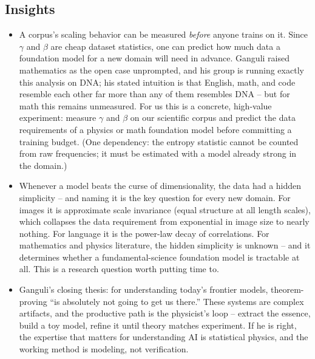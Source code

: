 \documentclass[11pt]{article}
\begin{document}
\subsection*{Insights}
\begin{itemize}
    \item A corpus's scaling behavior can be measured \emph{before} anyone trains on it. Since $\gamma$ and $\beta$ are cheap dataset statistics, one can predict how much data a foundation model for a new domain will need in advance. Ganguli raised mathematics as the open case unprompted, and his group is running exactly this analysis on DNA; his stated intuition is that English, math, and code resemble each other far more than any of them resembles DNA -- but for math this remains unmeasured. For us this is a concrete, high-value experiment: measure $\gamma$ and $\beta$ on our scientific corpus and predict the data requirements of a physics or math foundation model before committing a training budget. (One dependency: the entropy statistic cannot be counted from raw frequencies; it must be estimated with a model already strong in the domain.)
    \item Whenever a model beats the curse of dimensionality, the data had a hidden simplicity -- and naming it is the key question for every new domain. For images it is approximate scale invariance (equal structure at all length scales), which collapses the data requirement from exponential in image size to nearly nothing. For language it is the power-law decay of correlations. For mathematics and physics literature, the hidden simplicity is unknown -- and it determines whether a fundamental-science foundation model is tractable at all. This is a research question worth putting time to.
    \item Ganguli's closing thesis: for understanding today's frontier models, theorem-proving ``is absolutely not going to get us there.'' These systems are complex artifacts, and the productive path is the physicist's loop -- extract the essence, build a toy model, refine it until theory matches experiment. If he is right, the expertise that matters for understanding AI is statistical physics, and the working method is modeling, not verification.
\end{itemize}
\end{document}
